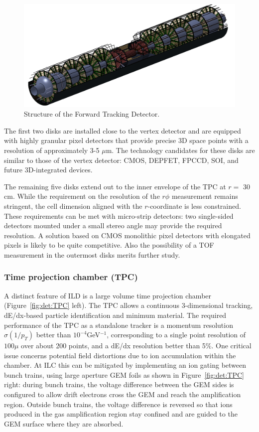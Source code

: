 \begin{figure}[t!]
\centering
\includegraphics[width=0.75\hsize]{Detector/fig/FTD.png}
\caption{Structure of the Forward Tracking Detector.}
\label{fig:det:FTD}
\end{figure}

The first two disks are installed close to the vertex detector and are equipped with highly granular pixel detectors that provide precise 3D space points with a resolution of approximately 3-5 $\mu\mathrm{m}$. The technology candidates for these disks are similar to those of the vertex detector: CMOS, DEPFET, FPCCD, SOI, and future 3D-integrated devices. 

The remaining five disks extend out to the inner envelope of the TPC at $r=$ 30 cm. While the requirement on the resolution of the $r\phi$ measurement remains stringent, the cell dimension aligned with the $r$-coordinate is less constrained. These requirements can be met with micro-strip detectors: two single-sided detectors mounted under a small stereo angle may provide the required resolution. A solution based on CMOS monolithic pixel detectors with elongated pixels is likely to be quite competitive. Also the possibility of a TOF measurement in the outermost disks merits further study.

\subsubsection{Time projection chamber (TPC)}

A distinct feature of ILD is a large volume time projection chamber (Figure~\ref{fig:det:TPC} left). The TPC allows a continuous 3-dimensional tracking, dE/dx-based particle identification and minimum material. The required performance of the TPC as a standalone tracker is a momentum resolution $\sigma(1/p_T)$ better than $10^{-4}$GeV$^{-1}$, corresponding to a single point resolution of $100\mu$ over about 200 points, and a dE/dx resolution better than 5\%. One critical issue concerns potential field distortions due to ion accumulation within the chamber. At ILC this can be mitigated by implementing an ion gating between bunch trains, using large aperture GEM foils as shown in Figure~\ref{fig:det:TPC} right: during bunch trains, the voltage difference between the GEM sides is configured to allow drift electrons cross the GEM and reach the amplification region. Outside bunch trains, the voltage difference is reversed so that ions produced in the gas amplification region stay confined and are guided to the GEM surface where they are absorbed. 

